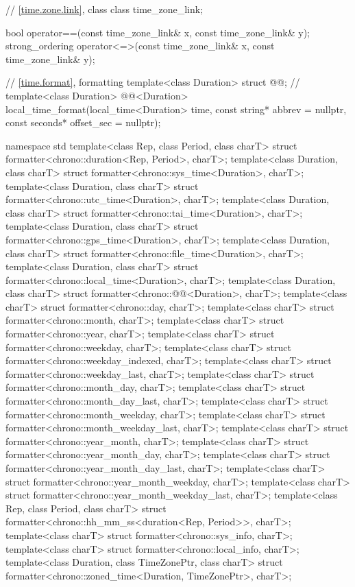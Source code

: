 \begin{codeblock}
{  // \ref{time.zone.link}, class 
  class time_zone_link;

  bool operator==(const time_zone_link& x, const time_zone_link& y);
  strong_ordering operator<=>(const time_zone_link& x, const time_zone_link& y);

  // \ref{time.format}, formatting
  template<class Duration> struct @@;        // \expos
  template<class Duration>
    @@<Duration>
      local_time_format(local_time<Duration> time, const string* abbrev = nullptr,
                        const seconds* offset_sec = nullptr);
}

namespace std {
  template<class Rep, class Period, class charT>
    struct formatter<chrono::duration<Rep, Period>, charT>;
  template<class Duration, class charT>
    struct formatter<chrono::sys_time<Duration>, charT>;
  template<class Duration, class charT>
    struct formatter<chrono::utc_time<Duration>, charT>;
  template<class Duration, class charT>
    struct formatter<chrono::tai_time<Duration>, charT>;
  template<class Duration, class charT>
    struct formatter<chrono::gps_time<Duration>, charT>;
  template<class Duration, class charT>
    struct formatter<chrono::file_time<Duration>, charT>;
  template<class Duration, class charT>
    struct formatter<chrono::local_time<Duration>, charT>;
  template<class Duration, class charT>
    struct formatter<chrono::@@<Duration>, charT>;
  template<class charT> struct formatter<chrono::day, charT>;
  template<class charT> struct formatter<chrono::month, charT>;
  template<class charT> struct formatter<chrono::year, charT>;
  template<class charT> struct formatter<chrono::weekday, charT>;
  template<class charT> struct formatter<chrono::weekday_indexed, charT>;
  template<class charT> struct formatter<chrono::weekday_last, charT>;
  template<class charT> struct formatter<chrono::month_day, charT>;
  template<class charT> struct formatter<chrono::month_day_last, charT>;
  template<class charT> struct formatter<chrono::month_weekday, charT>;
  template<class charT> struct formatter<chrono::month_weekday_last, charT>;
  template<class charT> struct formatter<chrono::year_month, charT>;
  template<class charT> struct formatter<chrono::year_month_day, charT>;
  template<class charT> struct formatter<chrono::year_month_day_last, charT>;
  template<class charT> struct formatter<chrono::year_month_weekday, charT>;
  template<class charT> struct formatter<chrono::year_month_weekday_last, charT>;
  template<class Rep, class Period, class charT>
    struct formatter<chrono::hh_mm_ss<duration<Rep, Period>>, charT>;
  template<class charT> struct formatter<chrono::sys_info, charT>;
  template<class charT> struct formatter<chrono::local_info, charT>;
  template<class Duration, class TimeZonePtr, class charT>
    struct formatter<chrono::zoned_time<Duration, TimeZonePtr>, charT>;
}


\end{codeblock}
